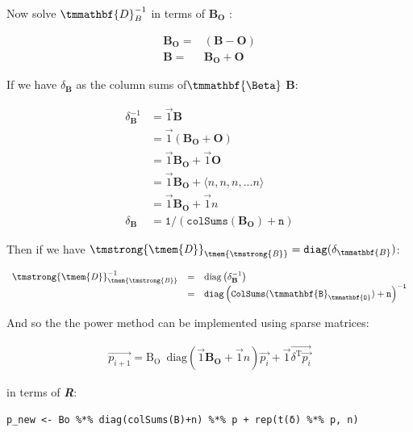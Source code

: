 \documentclass[11pt]{article}
\begin{document}
\begin{enumerate}
Now solve \(\tmmathbf{D}_B^{- 1}\) in terms of \(\mathbf{B_{O}}\) :

\begin{align}
  \mathbf{B}_{\mathbf{\mathbf{O}}} = & (\mathbf{B}-\mathbf{O})\\
  \mathbf{B} = & \mathbf{B}_{\mathbf{\mathbf{O}}}
  +\mathbf{O}
\end{align}

If we have \(\delta_{\mathbf{B}}\) as the column sums of\(\tmmathbf{\Beta}\) \(\mathbf{B}\):

\begin{align}
\delta^{-1}_{\mathbf{B}} &= \vec{1}\mathbf{B} \\
&= \vec{1} \left( \mathbf{B_{O}} + \mathbf{O}\right) \\
&= \vec{1}  \mathbf{B_{O}} + \vec{1}\mathbf{O} \\
&= \vec{1} \mathbf{B_{\mathbf{O}}} + \langle n, n, n, ... n \rangle \\
&= \vec{1} \mathbf{B_{\mathbf{O}}} + \vec{1} n \\
\delta_{\mathbf{B}}&=\mathtt{1/(colSums(\mathbf{B_{O}}) + n )}
\end{align}

Then if we have \(\mathit{{\tmstrong{{\tmem{D}}}}}_{\mathit{{\tmem{{\tmstrong{B}}}}}} =
\mathtt{diag} (\delta_{\tmmathbf{B}}) \mathtt{}\):


\[ \begin{array}{lll}
     \mathit{{\tmstrong{{\tmem{D}}}}}_{\mathit{{\tmem{{\tmstrong{B}}}}}}^{- 1}
     & = & \mathrm{diag} \left( \delta^{- 1}_{\mathbf{B}} \right)\\
     & = & \mathtt{diag} \left( \mathtt{ColSums}
     (\mathtt{\tmmathbf{B}_{\tmmathbf{O}}}) + \mathtt{n}
     \right)^{\mathtt{- 1}}
   \end{array} \]

And so the the power method can be implemented using sparse matrices:

\begin{align}
\vec{p_{i+1}} = \mathrm{B_{O}} \enspace \mathrm{diag}\left( \vec{1} \mathbf{B_{O}} + \vec{1}n \right) \vec{p_{i}} + \vec{1} \vec{\delta^{\mathrm{T}}\vec{p_{i}}}
\end{align}

in terms of \textbf{\emph{R}}:

\lstset{language=r,label= ,caption= ,captionpos=b,numbers=none}
\begin{lstlisting}
p_new <- Bo %*% diag(colSums(B)+n) %*% p + rep(t(δ) %*% p, n)


\end{lstlisting}
\end{enumerate}
\end{document}
